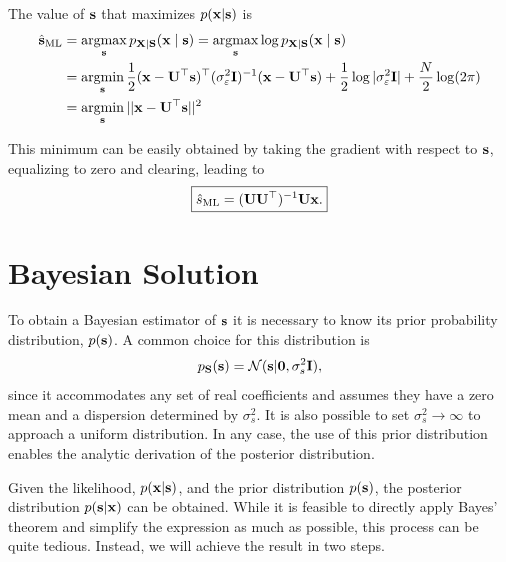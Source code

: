 The value of ${\mathbf s}$ that maximizes $p({\mathbf x} | {\mathbf s})$ is
\begin{align}
\hat{{\mathbf s}}_\text{ML} 
   &= \operatorname*{argmax}_{{\mathbf s}} p_{{\bf X}|{\bf S}}( {\mathbf x} \mid {\mathbf s} ) 
    = \operatorname*{argmax}_{{\mathbf s}} \log p_{{\bf X}|{\bf S}}( {\mathbf x} \mid {\mathbf s} ) \nonumber \\
   &= \operatorname*{argmin}_{{\mathbf s}} \frac{1}{2} ({\mathbf x} - {\mathbf U}^\top{\mathbf s})^\top(\sigma_\varepsilon^2{\mathbf I})^{-1}
                              ({\mathbf x} - {\mathbf U}^\top{\mathbf s}) 
                + \frac{1}{2} \log|\sigma_\varepsilon^2{\mathbf I}|+\frac{N}{2}\log(2\pi) 
                \nonumber \\
   &= \operatorname*{argmin}_{{\mathbf s}} ||{\mathbf x} - {\mathbf U}^\top{\mathbf s}||^2     \nonumber \\
\label{sml_comp}
\end{align}

This minimum can be easily obtained by taking the gradient with respect to ${\mathbf s}$, equalizing to zero and clearing, leading to
\begin{align}
\boxed{\hat{s}_\text{ML} = ({\mathbf U} {\mathbf U}^\top)^{-1} {\mathbf U}{\mathbf x}.}
\label{sml}
\end{align}

\section{Bayesian Solution}

To obtain a Bayesian estimator of ${\mathbf s}$ it is necessary to know its prior probability distribution, $p({\mathbf s})$. A common choice for this distribution is
\begin{equation}
p_{\bf S}({\mathbf s}) = {\mathcal N}({\mathbf s} | \mathbf{0}, \sigma_s^2{\mathbf I}),
\end{equation}
since it accommodates any set of real coefficients and assumes they have a zero mean and a dispersion determined by $\sigma_s^2 $. It is also possible to set $\sigma_s^2 \rightarrow \infty$ to approach a uniform distribution. In any case, the use of this prior distribution enables the analytic derivation of the posterior distribution.

Given the likelihood, $p({\mathbf x} | {\mathbf s})$, and the prior distribution $p({\mathbf s})$, the posterior distribution $p({\mathbf s} | {\mathbf x}) $ can be obtained. While it is feasible to directly apply Bayes' theorem and simplify the expression as much as possible, this process can be quite tedious. Instead, we will achieve the result in two steps.

